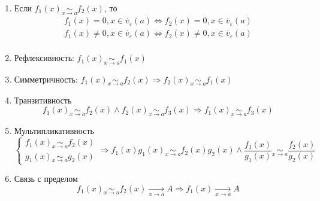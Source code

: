 \documentclass[class=article,a4paper,12pt,crop=false]{standalone}
\begin{document}
\begin{enumerate}
    \item {
        Если $f_1(x) \underset{x \rightarrow a}{\sim} f_2(x)$, то
        \begin{equation}
            \begin{aligned}
                f_1(x) = 0, x\in \overset{\cdot}{v}_\varepsilon(a) \Leftrightarrow
                f_2(x) = 0, x\in \overset{\cdot}{v}_\varepsilon(a) \\
                f_1(x) \neq 0, x\in \overset{\cdot}{v}_\varepsilon(a) \Leftrightarrow
                f_2(x) \neq 0, x\in \overset{\cdot}{v}_\varepsilon(a) \\
            \end{aligned}
        \end{equation}
    }
    \item {
        Рефлексивность: $f_1(x) \underset{x \rightarrow a}{\sim} f_1(x)$
    }
    \item {
        Симметричность: $f_1(x) \underset{x \rightarrow a}{\sim} f_2(x) \Rightarrow
        f_2(x) \underset{x \rightarrow a}{\sim} f_1(x)$
    }
    \item {
        Транзитивность
        \begin{equation}
            f_1(x) \underset{x \rightarrow a}{\sim} f_2(x) \land
            f_2(x) \underset{x \rightarrow a}{\sim} f_3(x) \Rightarrow f_1(x) \underset{x \rightarrow a}{\sim} f_3(x)
        \end{equation}
    }
    \item {
        Мультипликативность
        \begin{equation}
            \begin{cases}
                f_1(x) \underset{x \rightarrow a}{\sim} f_2(x) \\
                g_1(x) \underset{x \rightarrow a}{\sim} g_2(x)
            \end{cases} \Rightarrow
            f_1(x)g_1(x) \underset{x \rightarrow a}{\sim} f_2(x)g_2(x) \land
            \frac{f_1(x)}{g_1(x)} \underset{x \rightarrow a}{\sim} \frac{f_2(x)}{g_2(x)}
        \end{equation}
    }
    \item {
        Связь с пределом
        \begin{equation}
            f_1(x) \underset{x \rightarrow a}{\sim} f_2(x) \underset{x \rightarrow a}{\longrightarrow} A
            \Rightarrow f_1(x) \underset{x \rightarrow a}{\longrightarrow} A
        \end{equation}
    }
\end{enumerate}
\end{document}
